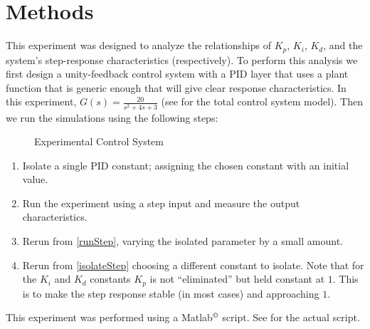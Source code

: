 \documentclass[main.tex]{subfile}
\begin{document}
\section{Methods} 
\label{sec:methods}

This experiment was designed to analyze the relationships of $K_p$, $K_i$,
$K_d$, and the system's step-response characteristics (respectively). To perform
this analysis we first design a unity-feedback control system with a PID layer
that uses a plant function that is generic enough that will give clear response
characteristics. In this experiment, $G(s) = \frac{20}{s^2+4s+3} \label{eq:gs}$ (see
 for the total control system model). Then we run the
simulations using the following steps:

\begin{figure}
  
  \caption{Experimental Control System}
  \label{fig:ctrlSys}
\end{figure}

\begin{enumerate}

  \item \label{isolateStep}
    Isolate a single PID constant; assigning the chosen constant with an initial
    value.

  \item \label{runStep} 
    Run the experiment using a step input and measure the output characteristics.

  \item Rerun from \ref{runStep}, varying the isolated parameter by a small
    amount.

  \item Rerun from \ref{isolateStep} choosing a different constant to isolate.
    Note that for the $K_i$ and $K_d$ constants $K_p$ is not ``eliminated'' but
    held constant at $1$. This is to make the step response stable (in most
    cases) and approaching $1$.
\end{enumerate}

This experiment was performed using a Matlab$^\copyright$ script. See
 for the actual script.

\end{document}
